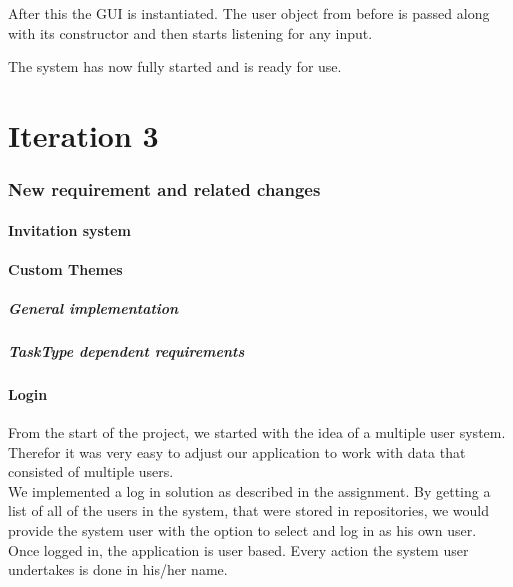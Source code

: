 	After this the GUI is instantiated. The user object from before is passed along with its constructor and then starts listening for any input. 
	
	The system has now fully started and is ready for use.	
	
	\part{Iteration 3}
	
	\section{New requirement and related changes}
		\subsection{Invitation system}
	
		\subsection{Custom Themes}
			\subsubsection{General implementation}
			\subsubsection{TaskType dependent requirements}
		
		\subsection{Login}
			From the start of the project, we started with the idea of a multiple user system. Therefor it was very easy to adjust our application to work with data that consisted of multiple users.\\
			We implemented a log in solution as described in the assignment. By getting a list of all of the users in the system, that were stored in repositories, we would provide the system user with the option to select and log in as his own user.\\
			Once logged in, the application is user based. Every action the system user undertakes is done in his/her name.
